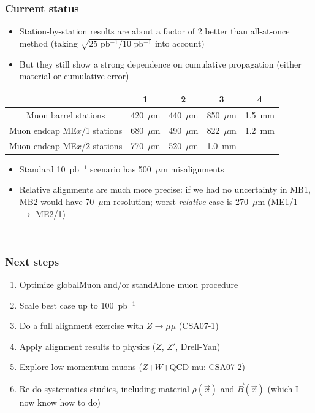 \documentclass[compress]{beamer}
\begin{document}
\begin{frame}
\frametitle{Current status}

\begin{itemize}\setlength{\itemsep}{0.25 cm}
\item Station-by-station results are about a factor of 2 better
than all-at-once method (taking $\sqrt{\mbox{25 pb$^{-1}$}/\mbox{10
pb$^{-1}$}}$ into account)
\item But they still show a strong dependence on cumulative
propagation (either material or cumulative error)
\end{itemize}

\vspace{0.25 cm}
\hspace{-0.5 cm} \begin{minipage}{\linewidth}
\begin{tabular}{c c c c c}
& 1 & 2 & 3 & 4 \\\hline
Muon barrel stations & 420~$\mu$m & 440~$\mu$m & 850~$\mu$m & 1.5~mm \\
Muon endcap ME$x$/1 stations & 680~$\mu$m & 490~$\mu$m & 822~$\mu$m & 1.2~mm\\
Muon endcap ME$x$/2 stations & 770~$\mu$m & 520~$\mu$m & 1.0~mm & \\
\end{tabular}
\end{minipage}

\vspace{0.25 cm}
\begin{itemize}\setlength{\itemsep}{0.25 cm}
\item Standard 10~pb$^{-1}$ scenario has 500~$\mu$m misalignments

\item Relative alignments are much more precise: if we had no
uncertainty in MB1, MB2 would have 70~$\mu$m resolution; worst {\it
relative} case is 270~$\mu$m (ME1/1 $\to$ ME2/1)
\end{itemize}

\vfill
\mbox{ }
\end{frame}

\begin{frame}
\frametitle{Next steps}
\begin{enumerate}\setlength{\itemsep}{0.5 cm}
\item Optimize globalMuon and/or standAlone muon procedure
\item Scale best case up to 100~pb$^{-1}$
\item Do a full alignment exercise with $Z\to\mu\mu$ (CSA07-1)
\item Apply alignment results to physics ($Z$, $Z'$, Drell-Yan)
\item Explore low-momentum muons ($Z$$+$$W$$+$QCD-mu: CSA07-2)
\item Re-do systematics studies, including material $\rho(\vec{x})$ and
$\vec{B}(\vec{x})$ (which I now know how to do)
\end{enumerate}
\label{numpages}
\end{frame}
\end{document}
